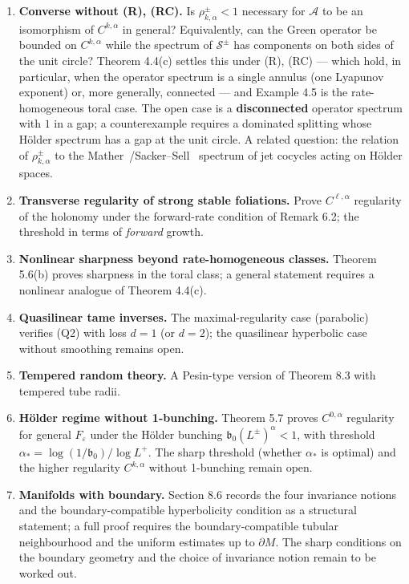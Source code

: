 \documentclass[11pt,a4paper]{article}
\theoremstyle{plain}
\theoremstyle{definition}
\theoremstyle{remark}
\numberwithin{equation}{section}
\numberwithin{figure}{section}
\begin{document}
\begin{enumerate}
    \item \textbf{Converse without (R), (RC).} Is $\rho^\pm_{k,\alpha}<1$ necessary for $\mathcal A$ to be an isomorphism of $C^{k,\alpha}$ in general? Equivalently, can the Green operator be bounded on $C^{k,\alpha}$ while the spectrum of $\mathcal S^\pm$ has components on both sides of the unit circle? Theorem 4.4(c) settles this under (R), (RC) — which hold, in particular, when the operator spectrum is a single annulus (one Lyapunov exponent) or, more generally, connected — and Example 4.5 is the rate-homogeneous toral case. The open case is a \textbf{disconnected} operator spectrum with $1$ in a gap; a counterexample requires a dominated splitting whose Hölder spectrum has a gap at the unit circle. A related question: the relation of $\rho^\pm_{k,\alpha}$ to the Mather~\cite{mather1968}/Sacker–Sell~\cite{sacker1978} spectrum of jet cocycles acting on Hölder spaces.

    \item \textbf{Transverse regularity of strong stable foliations.} Prove $C^{\ell,\alpha}$ regularity of the holonomy under the forward-rate condition of Remark 6.2; the threshold in terms of \textit{forward} growth.

    \item \textbf{Nonlinear sharpness beyond rate-homogeneous classes.} Theorem 5.6(b) proves sharpness in the toral class; a general statement requires a nonlinear analogue of Theorem 4.4(c).

    \item \textbf{Quasilinear tame inverses.} The maximal-regularity case (parabolic) verifies (Q2) with loss \(d=1\) (or \(d=2\)); the quasilinear hyperbolic case without smoothing remains open.

    \item \textbf{Tempered random theory.} A Pesin-type version of Theorem 8.3 with tempered tube radii.

    \item \textbf{Hölder regime without 1-bunching.} Theorem 5.7 proves $C^{0,\alpha}$ regularity for general $F_\varepsilon$ under the Hölder bunching $\mathfrak b_0(L^\pm)^\alpha<1$, with threshold $\alpha_*=\log(1/\mathfrak b_0)/\log L^+$. The sharp threshold (whether $\alpha_*$ is optimal) and the higher regularity $C^{k,\alpha}$ without 1-bunching remain open.

    \item \textbf{Manifolds with boundary.} Section 8.6 records the four invariance notions and the boundary-compatible hyperbolicity condition as a structural statement; a full proof requires the boundary-compatible tubular neighbourhood and the uniform estimates up to \(\partial M\). The sharp conditions on the boundary geometry and the choice of invariance notion remain to be worked out.


\end{enumerate}
\end{document}
